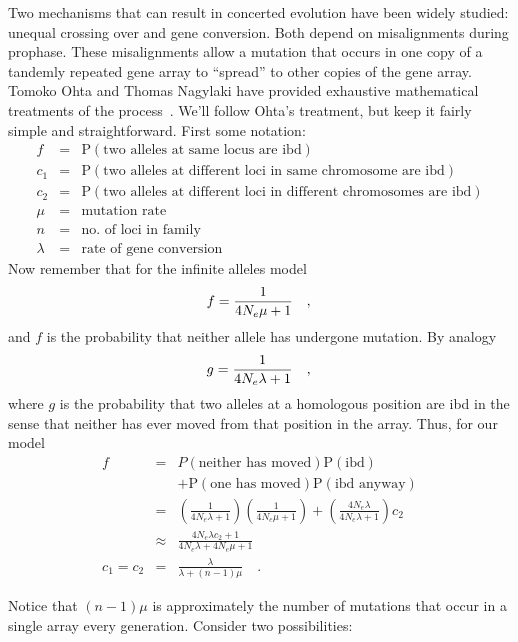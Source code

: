 Two mechanisms that can result in concerted evolution have been widely
studied: unequal crossing over and gene conversion. Both depend on
misalignments during prophase. These misalignments allow a mutation
that occurs in one copy of a tandemly repeated gene array to
``spread'' to other copies of the gene array. Tomoko Ohta and Thomas
Nagylaki have provided exhaustive mathematical treatments of the
process~\cite{Nagylaki84,Ohta84}. We'll follow Ohta's treatment, but
keep it fairly simple and straightforward. First some notation:
\begin{eqnarray*}
f   &=& \mbox{P}(\mbox{two alleles at same locus are ibd}) \\
c_1 &=& \mbox{P}(\mbox{two alleles at different loci in same
  chromosome are ibd}) \\
c_2 &=& \mbox{P}(\mbox{two alleles at different loci in different
  chromosomes are ibd}) \\
\mu &=& \mbox{mutation rate} \\
n &=& \mbox{no.\ of loci in family} \\
\lambda &=& \mbox{rate of gene conversion}
\end{eqnarray*}
Now remember that for the infinite alleles model
\[
f = \frac{1}{4N_e\mu + 1} \quad , \\
\]
and $f$ is the probability that neither allele has undergone
mutation. By analogy
\[
g = \frac{1}{4N_e\lambda + 1} \quad , \\
\]
where $g$ is the probability that two alleles at a homologous position
are ibd in the sense that neither has ever moved from that position in
the array. Thus, for our model
\begin{eqnarray*}
f &=& P(\mbox{neither has moved})\mbox{P}(\mbox{ibd}) \\
  && + \mbox{P}(\mbox{one has moved})\mbox{P}(\mbox{ibd anyway}) \\
  &=&
  \left(\frac{1}{4N_e\lambda+1}\right)\left(\frac{1}{4N_e\mu+1}\right) 
  + \left(\frac{4N_e\lambda}{4N_e\lambda+1}\right)c_2 \\
  &\approx& \frac{4N_e\lambda c_2 + 1}{4N_e\lambda + 4N_e\mu + 1}
  \\
c_1 = c_2 &=& \frac{\lambda}{\lambda + (n-1)\mu} \quad .
\end{eqnarray*}

Notice that $(n-1)\mu$ is approximately the number of mutations that
occur in a single array every generation. Consider two possibilities:

